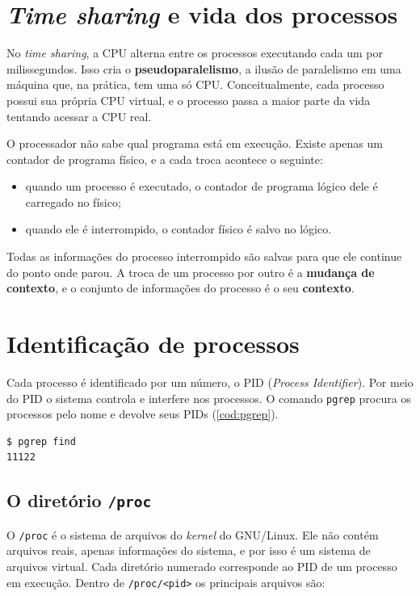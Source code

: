 \section{\textit{Time sharing} e vida dos processos}

No \textit{time sharing}, a CPU alterna entre os processos executando cada um por milissegundos. Isso cria o \textbf{pseudoparalelismo}, a ilusão de paralelismo em uma máquina que, na prática, tem uma só CPU. Conceitualmente, cada processo possui sua própria CPU virtual, e o processo passa a maior parte da vida tentando acessar a CPU real.

O processador não sabe qual programa está em execução. Existe apenas um contador de programa físico, e a cada troca acontece o seguinte:
\begin{itemize}
  \item quando um processo é executado, o contador de programa lógico dele é carregado no físico;
  \item quando ele é interrompido, o contador físico é salvo no lógico.
\end{itemize}
Todas as informações do processo interrompido são salvas para que ele continue do ponto onde parou. A troca de um processo por outro é a \textbf{mudança de contexto}, e o conjunto de informações do processo é o seu \textbf{contexto}.

\section{Identificação de processos}

Cada processo é identificado por um número, o PID (\textit{Process Identifier}). Por meio do PID o sistema controla e interfere nos processos. O comando \texttt{pgrep} procura os processos pelo nome e devolve seus PIDs (\autoref{cod:pgrep}).

\begin{lstlisting}[language=bash, caption={Procurando o PID de um processo}, label={cod:pgrep}]
$ pgrep find
11122
\end{lstlisting}

\subsection{O diretório \texttt{/proc}}

O \texttt{/proc} é o sistema de arquivos do \textit{kernel} do GNU/Linux. Ele não contém arquivos reais, apenas informações do sistema, e por isso é um sistema de arquivos virtual. Cada diretório numerado corresponde ao PID de um processo em execução. Dentro de \texttt{/proc/<pid>} os principais arquivos são:

